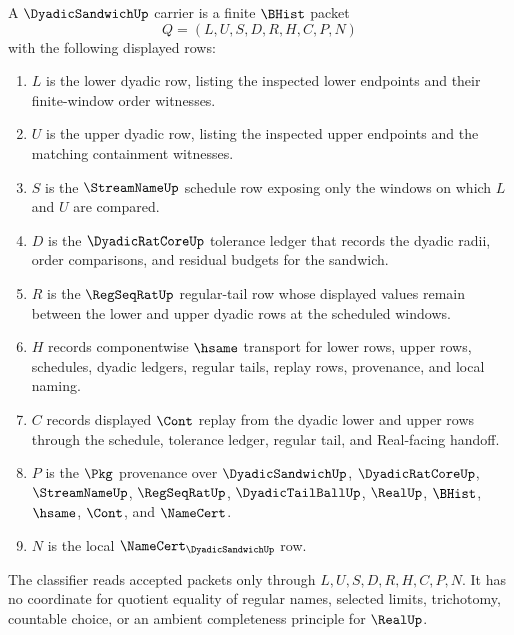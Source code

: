 \begin{definition}
\label{def:dyadic-sandwich-carrier}
A $\DyadicSandwichUp$ carrier is a finite $\BHist$ packet
$$
Q=(L,U,S,D,R,H,C,P,N)
$$
with the following displayed rows:
\begin{enumerate}
\item $L$ is the lower dyadic row, listing the inspected lower endpoints and their finite-window order witnesses.
\item $U$ is the upper dyadic row, listing the inspected upper endpoints and the matching containment witnesses.
\item $S$ is the $\StreamNameUp$ schedule row exposing only the windows on which $L$ and $U$ are compared.
\item $D$ is the $\DyadicRatCoreUp$ tolerance ledger that records the dyadic radii, order comparisons, and residual budgets for the sandwich.
\item $R$ is the $\RegSeqRatUp$ regular-tail row whose displayed values remain between the lower and upper dyadic rows at the scheduled windows.
\item $H$ records componentwise $\hsame$ transport for lower rows, upper rows, schedules, dyadic ledgers, regular tails, replay rows, provenance, and local naming.
\item $C$ records displayed $\Cont$ replay from the dyadic lower and upper rows through the schedule, tolerance ledger, regular tail, and Real-facing handoff.
\item $P$ is the $\Pkg$ provenance over $\DyadicSandwichUp$, $\DyadicRatCoreUp$, $\StreamNameUp$, $\RegSeqRatUp$, $\DyadicTailBallUp$, $\RealUp$, $\BHist$, $\hsame$, $\Cont$, and $\NameCert$.
\item $N$ is the local $\NameCert_{\DyadicSandwichUp}$ row.
\end{enumerate}
The classifier reads accepted packets only through $L,U,S,D,R,H,C,P,N$. It has no coordinate for quotient equality of regular names, selected limits, trichotomy, countable choice, or an ambient completeness principle for $\RealUp$.
\end{definition}

